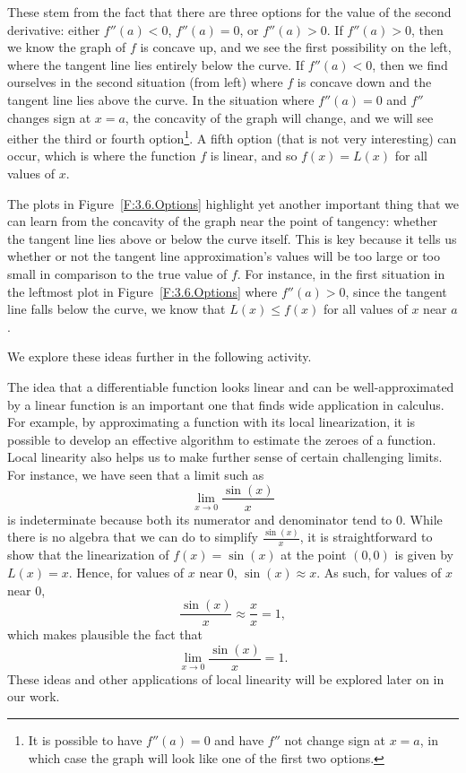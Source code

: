 These stem from the fact that there are three options for the value of the second derivative:  either $f''(a) <0$, $f''(a) = 0$, or $f''(a) > 0$.  If $f''(a) > 0$, then we know the graph of $f$ is concave up, and we see the first possibility on the left, where the tangent line lies entirely below the curve.  If $f''(a) < 0$, then we find ourselves in the second situation (from left) where $f$ is concave down and the tangent line lies above the curve.  In the situation where $f''(a) = 0$ and $f''$ changes sign at $x = a$, the concavity of the graph will change, and we will see either the third or fourth option\footnote{It is possible to have $f''(a) = 0$ and have $f''$ not change sign at $x = a$, in which case the graph will look like one of the first two options.}.  A fifth option (that is not very interesting) can occur, which is where the function $f$ is linear, and so $f(x) = L(x)$ for all values of $x$.

The plots in Figure~\ref{F:3.6.Options} highlight yet another important thing that we can learn from the concavity of the graph near the point of tangency: whether the tangent line lies above or below the curve itself.  This is key because it tells us whether or not the tangent line approximation's values will be too large or too small in comparison to the true value of $f$.  For instance, in the first situation in the leftmost plot in Figure~\ref{F:3.6.Options} where $f''(a) > 0$, since the tangent line falls below the curve, we know that $L(x) \le f(x)$ for all values of $x$ near $a$.

We explore these ideas further in the following activity.


The idea that a differentiable function looks linear and can be well-approximated by a linear function is an important one that finds wide application in calculus.  For example, by approximating a function with its local linearization, it is possible to develop an effective algorithm to estimate the zeroes of a function.  Local linearity also helps us to make further sense of certain challenging limits.  For instance, we have seen that a limit such as
$$\lim_{x \to 0} \frac{\sin(x)}{x}$$
is indeterminate because both its numerator and denominator tend to $0$.  While there is no algebra that we can do to simplify $\frac{\sin(x)}{x}$, it is straightforward to show that the linearization of $f(x) = \sin(x)$ at the point $(0,0)$ is given by $L(x) = x$.  Hence, for values of $x$ near $0$, $\sin(x) \approx x$.  As such, for values of $x$ near $0$, 
$$\frac{\sin(x)}{x} \approx \frac{x}{x} = 1,$$
which makes plausible the fact that $$\lim_{x \to 0} \frac{\sin(x)}{x} = 1.$$
These ideas and other applications of local linearity will be explored later on in our work.

